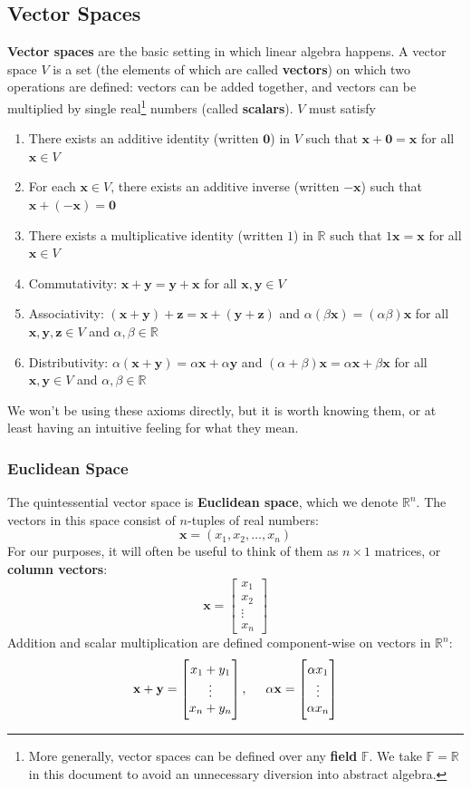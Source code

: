 \documentclass{article}
\newcommand{\F}{\mathbb{F}}
\newcommand{\R}{\mathbb{R}}
\renewcommand{\vec}[1]{\mathbf{#1}}
\newcommand{\matlit}[1]{\begin{bmatrix}#1\end{bmatrix}}
\newcommand{\term}[1]{\textbf{#1}}
\newcommand{\tab}{\hspace{0.5cm}}
\begin{document}
\subsection{Vector Spaces}
\term{Vector spaces} are the basic setting in which linear algebra happens. A vector space $V$ is a set (the elements of which are called \term{vectors}) on which two operations are defined: vectors can be added together, and vectors can be multiplied by single real\footnote{More generally, vector spaces can be defined over any \term{field} $\F$. We take $\F = \R$ in this document to avoid an unnecessary diversion into abstract algebra.} numbers (called \term{scalars}). $V$ must satisfy
\begin{enumerate}
\item There exists an additive identity (written $\vec{0}$) in $V$ such that $\vec{x}+\vec{0} = \vec{x}$ for all $\vec{x} \in V$
\item For each $\vec{x} \in V$, there exists an additive inverse (written $\vec{-x}$) such that $\vec{x}+(\vec{-x}) = \vec{0}$
\item There exists a multiplicative identity (written $1$) in $\R$ such that $1\vec{x} = \vec{x}$ for all $\vec{x} \in V$
\item Commutativity: $\vec{x}+\vec{y} = \vec{y}+\vec{x}$ for all $\vec{x}, \vec{y} \in V$
\item Associativity: $(\vec{x}+\vec{y})+\vec{z} = \vec{x}+(\vec{y}+\vec{z})$ and $\alpha(\beta\vec{x}) = (\alpha\beta)\vec{x}$ for all $\vec{x}, \vec{y}, \vec{z} \in V$ and $\alpha, \beta \in \R$
\item Distributivity: $\alpha(\vec{x}+\vec{y}) = \alpha\vec{x} + \alpha\vec{y}$ and $(\alpha+\beta)\vec{x} = \alpha\vec{x} + \beta\vec{x}$ for all $\vec{x}, \vec{y} \in V$ and $\alpha, \beta \in \R$
\end{enumerate}
We won't be using these axioms directly, but it is worth knowing them, or at least having an intuitive feeling for what they mean.

\subsubsection{Euclidean Space}
The quintessential vector space is \term{Euclidean space}, which we denote $\R^n$. The vectors in this space consist of $n$-tuples of real numbers:
\[\vec{x} = (x_1, x_2, \dots, x_n)\]
For our purposes, it will often be useful to think of them as $n \times 1$ matrices, or \term{column vectors}:
\[\vec{x} = \matlit{x_1 \\ x_2 \\ \vdots \\ x_n}\]
Addition and scalar multiplication are defined component-wise on vectors in $\R^n$:
\[\vec{x} + \vec{y} = \matlit{x_1 + y_1 \\ \vdots \\ x_n + y_n}, \tab \alpha\vec{x} = \matlit{\alpha x_1 \\ \vdots \\ \alpha x_n}\]
\end{document}
